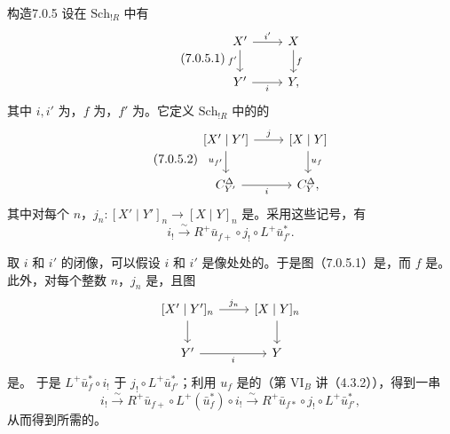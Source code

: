 \begin{SGAresult}{构造}{7.0.5}
设在 $\mathrm{Sch}_{!R}$ 中有
\begin{equation}\tag{7.0.5.1}
\begin{tikzcd}
X'\arrow[r,"i'"]\arrow[d,"f'"']&X\arrow[d,"f"]\\
Y'\arrow[r,"i"']&Y,
\end{tikzcd}
\end{equation}
其中 $i,i'$ 为，$f$ 为，$f'$ 为。它定义 $\mathrm{Sch}_{!R}$ 中的的
\begin{equation}\tag{7.0.5.2}
\begin{tikzcd}[]
{[X'\mid Y']}\arrow[r,"j"]\arrow[d,"u_{f'}"']&{[X\mid Y]}\arrow[d,"u_f"]\\
C_{Y'}^\Delta\arrow[r,"i"']&C_Y^\Delta,
\end{tikzcd}
\end{equation}
其中对每个 $n$，$j_n:[X'\mid Y']_n\to[X\mid Y]_n$ 是。采用这些记号，有
\[i_!\xrightarrow\sim R^+\bar u_{f+}\circ j_!\circ L^+\bar u_{f'}^*.\]
\end{SGAresult}
取 $i$ 和 $i'$ 的闭像，可以假设 $i$ 和 $i'$ 是像处处的。于是图（7.0.5.1）是，而 $f$ 是。此外，对每个整数 $n$，$j_n$ 是，且图
\[
\begin{tikzcd}[]
{[X'\mid Y']_n}\arrow[r,"j_n"]\arrow[d]&{[X\mid Y]_n}\arrow[d]\\
Y'\arrow[r,"i"']&Y
\end{tikzcd}
\]
是。
于是 $L^+\bar u_f^*\circ i_!$ 于 $j_!\circ L^+\bar u_{f'}^*$；利用 $u_f$ 是的（第 VI$_B$ 讲（4.3.2）），得到一串
\[i_!\xrightarrow\sim R^+\bar u_{f+}\circ L^+(\bar u_f^*)\circ i_!
\xrightarrow\sim R^+\bar u_{f*}\circ j_!\circ L^+\bar u_{f'}^*,\]
从而得到所需的。

